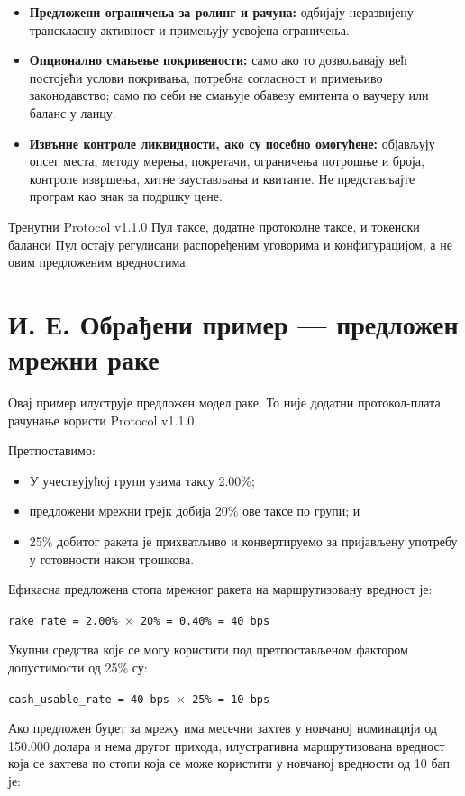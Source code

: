 \documentclass[11pt]{article}
\begin{document}
\begin{itemize}[leftmargin=*]
\item \textbf{Предложени ограничења за ролинг и рачуна:} одбијају неразвијену транскласну активност и примењују усвојена ограничења.
\item \textbf{Опционално смањење покривености:} само ако то дозвољавају већ постојећи услови покривања, потребна согласност и примењиво законодавство; само по себи не смањује обавезу емитента о ваучеру или баланс у ланцу.
\item \textbf{Извънне контроле ликвидности, ако су посебно омогућене:} објављују опсег места, методу мерења, покретачи, ограничења потрошње и броја, контроле извршења, хитне заустављања и квитанте. Не представљајте програм као знак за подршку цене.
\end{itemize}
Тренутни Protocol v1.1.0 Пул таксе, додатне протоколне таксе, и токенски баланси Пул остају регулисани распоређеним уговорима и конфигурацијом, а не овим предложеним вредностима.


\section*{И. Е. Обрађени пример --- предложен мрежни раке}

Овај пример илуструје предложен модел раке. То није додатни протокол-плата рачунање користи Protocol v1.1.0.

Претпоставимо:

\begin{itemize}[leftmargin=*]
\item У учествујућој групи узима таксу 2.00\%;
\item предложени мрежни грејк добија 20\% ове таксе по групи; и
\item 25\% добитог ракета је прихватљиво и конвертируемо за пријављену употребу у готовности након трошкова.
\end{itemize}
Ефикасна предложена стопа мрежног ракета на маршрутизовану вредност је:

\texttt{rake\_rate = 2.00\% $\times$ 20\% = 0.40\% = 40 bps}

Укупни средства које се могу користити под претпостављеном фактором допустимости од 25\% су:

\texttt{cash\_usable\_rate = 40 bps $\times$ 25\% = 10 bps}

Ако предложен буџет за мрежу има месечни захтев у новчаној номинацији од 150.000 долара и нема другог прихода, илустративна маршрутизована вредност која се захтева по стопи која се може користити у новчаној вредности од 10 бап је:
\end{document}
